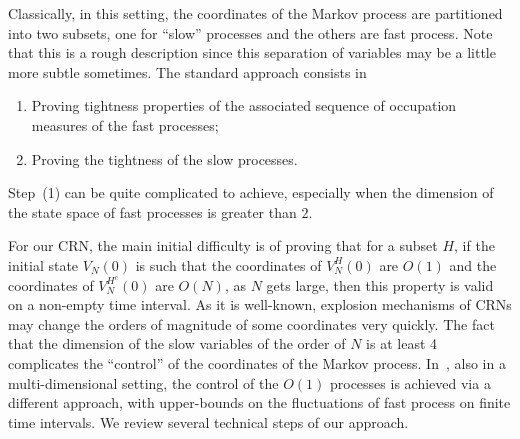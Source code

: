\documentclass[english]{amsart}
\numberwithin{proposition}{section}
\begin{document}
Classically, in this setting, the coordinates of the Markov process are partitioned into two subsets, one for ``slow'' processes and the others are fast process. Note that this is a rough description since this separation of variables may be a little more subtle sometimes. The standard approach consists in
\begin{enumerate}
\item Proving  tightness properties of the associated sequence of occupation measures of the fast processes;
  \item Proving the tightness of the slow processes. 
\end{enumerate}
Step~(1) can be quite complicated to achieve, especially when the dimension of the state space of fast processes is greater than $2$.

For our CRN, the main initial difficulty is of proving that for a subset $H$, if the initial state $V_N(0)$ is such that the coordinates of $V_N^H(0)$ are $O(1)$ and the coordinates of $V_N^{H^c}(0)$ are $O(N)$, as $N$ gets large, then this property is valid on a non-empty time interval. As it is well-known, explosion mechanisms of CRNs may change the orders of magnitude of some coordinates very quickly. The fact that the dimension of the slow variables of the order of $N$ is at least 4 complicates the ``control'' of the coordinates of the Markov process. In~\citet{FRZ25}, also in a multi-dimensional setting, the control of the $O(1)$ processes is achieved via a different approach,  with upper-bounds on the fluctuations of fast process on finite time intervals. We review several technical steps of our approach. 
\end{document}
